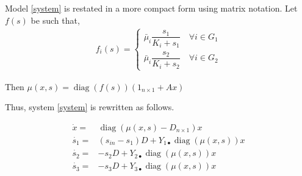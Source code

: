 \documentclass[3p,times]{article}
\newcommand{\R}{\mathbb{R}}
\DeclareMathOperator{\diag}{diag}
\begin{document}
Model \eqref{system} is restated in a more compact form using matrix notation. Let $f(s)$ be such that,
%
\begin{align}
f_i(s) = \begin{cases}
\bar{\mu}_i \dfrac{s_1}{K_i + s_1} \quad \forall i \in G_1 \\
\bar{\mu}_i \dfrac{s_2}{K_i + s_2} \quad \forall i \in G_2
\end{cases}
\end{align}

Then $\mu(x,s) = \diag(f(s))(1_{n\times 1} + Ax)$

Thus, system \eqref{system} is rewritten as follows. 

\begin{align}
\label{Eq1}	\dot{x} = & \diag(\mu(x,s) - D_{n\times 1})x \\
\label{Eq2}	\dot{s_1} = & (s_{in}-s_1)D + Y_{1\bullet} \diag(\mu(x,s))x \\
\label{Eq3}	\dot{s_2} = & -s_2D+
Y_{2\bullet} \diag(\mu(x,s))x\\	
\label{Eq4}	\dot{s_3} = & -s_3D+Y_{3\bullet} \diag(\mu(x,s))x 
\end{align} 
\end{document}
